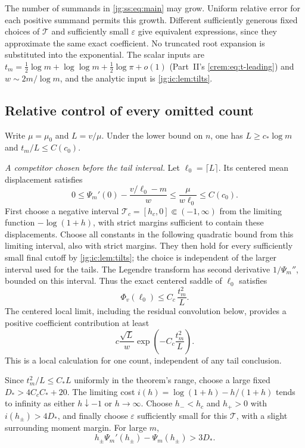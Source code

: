 \documentclass[11pt,a4paper]{article}
\theoremstyle{definition}\newaliascnt{definition}{theorem}
\theoremstyle{remark}\newaliascnt{remark}{theorem}
\begin{document}
The number of summands in \eqref{jg:ss:eq:main} may grow. Uniform relative
error for each positive summand permits this growth. Different sufficiently
generous fixed choices of $\mathcal T$ and sufficiently small $\varepsilon$
give equivalent expressions, since they approximate the same exact coefficient.
No truncated root expansion is substituted into the exponential. The scalar
inputs are $t_m=\tfrac12\log m+\log\log m+\tfrac12\log\pi+o(1)$ (Part~II's
\eqref{crem:eq:t-leading}) and $w\sim2m/\log m$, and the analytic input is
\cref{jg:ic:lem:tilts}.

\subsection{Relative control of every omitted count}
\label{jg:sec:ss-tails}
Write $\mu=\mu_0$ and $L=v/\mu$. Under the lower bound on $n$, one has
$L\ge c_*\log m$ and $t_m/L\le C(c_0)$.

\emph{A competitor chosen before the tail interval.} Let $\ell_0=\lceil L\rceil$.
Its centered mean displacement satisfies
\[
 0\le\Psi_m'(0)-\frac{v/\ell_0-m}{w}
   \le\frac{\mu}{w\ell_0}\le C(c_0).
\]
First choose a negative interval $\mathcal T_c=[h_c,0]\Subset(-1,\infty)$ from
the limiting function $-\log(1+h)$, with strict margins sufficient to contain
these displacements. Choose all constants in the following quadratic bound from
this limiting interval, also with strict margins. They then hold for every
sufficiently small final cutoff by \cref{jg:ic:lem:tilts}; the choice is
independent of the larger interval used for the tails. The Legendre transform
has second derivative $1/\Psi_m''$, bounded on this interval. Thus the exact
centered saddle of $\ell_0$ satisfies
\begin{equation}\label{jg:ss:eq:competitorcost}
 \Phi_v(\ell_0)\le C_c\,\frac{t_m^2}{L}.
\end{equation}
The centered local limit, including the residual convolution below, provides a
positive coefficient contribution at least
\begin{equation}\label{jg:ss:eq:competitor}
 c\frac{\sqrt L}{w}\exp\!\left(-C_c\frac{t_m^2}{L}\right).
\end{equation}
This is a local calculation for one count, independent of any tail conclusion.

Since $t_m^2/L\le C_*L$ uniformly in the theorem's range, choose a large fixed
$D_*>4C_cC_*+20$. The limiting cost $i(h)=\log(1+h)-h/(1+h)$ tends to infinity
as either $h\downarrow-1$ or $h\to\infty$. Choose $h_-<h_c$ and $h_+>0$ with
$i(h_\pm)>4D_*$, and finally choose $\varepsilon$ sufficiently small for this
$\mathcal T$, with a slight surrounding moment margin. For large $m$,
\begin{equation}\label{jg:ss:eq:tailcost}
 h_\pm\Psi_m'(h_\pm)-\Psi_m(h_\pm)>3D_*.
\end{equation}
\end{document}

